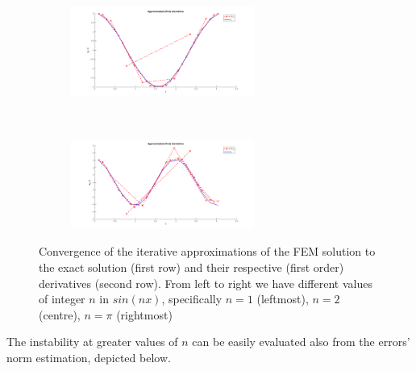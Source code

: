 \documentclass[12pt,openany,twoside,a4paper]{article}
\begin{document}
\begin{figure}[H]
\begin{subfigure}[h]{0.3\textwidth}
    \end{subfigure}
     ~ \;
     \begin{subfigure}[h]{0.3\textwidth}
        \includegraphics[keepaspectratio,width=6cm]{cos2x.png}
    \end{subfigure}
     ~ \;
     \begin{subfigure}[h]{0.3\textwidth}
        \includegraphics[keepaspectratio,width=6cm]{cospix.png}
    \end{subfigure}
    \captionsetup{singlelinecheck=off}
    \caption{Convergence of the iterative approximations of the FEM solution to the exact solution (first row) and their respective (first order) derivatives (second row). From left to right we have different values of integer $n$ in $sin(nx)$, specifically $n=1$ (leftmost), $n=2$ (centre), $n=\pi$ (rightmost)}
    \label{fig1}
\end{figure}
The instability at greater values of $n$ can be easily evaluated also from the errors' norm estimation, depicted below.
\end{document}
